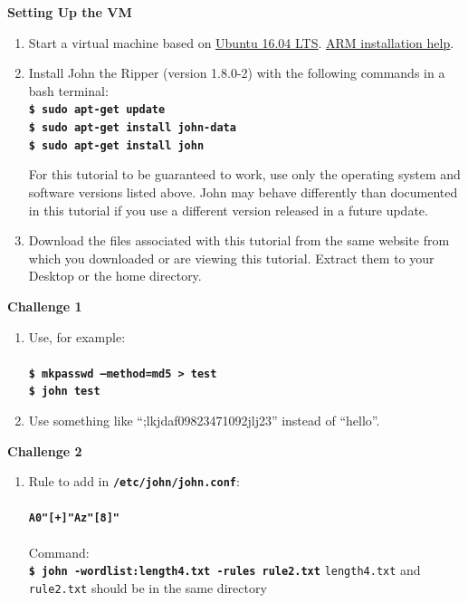 \documentclass[12pt]{extarticle}
\newcommand{\code}[1]{\texttt{\bfseries#1}}
\newcommand{\ben}{\begin{enumerate}}
\newcommand{\een}{\end{enumerate}}
\begin{document}
	\textbf{Setting Up the VM}
	
	\begin{enumerate}
		\item Start a virtual machine based on \hyperref{https://releases.ubuntu.com/16.04/}{}{}{\underline{Ubuntu 16.04 LTS}}. \hyperref{https://wiki.ubuntu.com/ARM/Server/Install}{}{}{\underline{ARM installation help}}.
		\item Install John the Ripper (version 1.8.0-2) with the following commands in a bash terminal:\\
		\code{\$ sudo apt-get update \\
			\$ sudo apt-get install john-data \\
			\$ sudo apt-get install john}
		
		For this tutorial to be guaranteed to work, use only the operating system and software versions listed above. John may behave differently than documented in this tutorial if you use a different version released in a future update.
		\item{Download the files associated with this tutorial from the same website from which you downloaded or are viewing this tutorial. Extract them to your Desktop or the home directory.}
	\end{enumerate}
	
	\textbf{Challenge 1}
	
	\ben
	
	\item Use, for example: \\\\
	\code{\$ mkpasswd --method=md5 > test\\
		\$ john test} \\
	
	\item Use something like ``;lkjdaf09823471092jlj23'' instead of ``hello''.
	
	\een
	
	\textbf{Challenge 2}
	\ben
	
	\item Rule to add in \code{/etc/john/john.conf}: \\\\
	\code{A0"[+]"Az"[8]"}\\\\
	Command:\\ \code{\$ john -wordlist:length4.txt -rules rule2.txt}
	\texttt{length4.txt} and \texttt{rule2.txt} should be in the same directory
	
	\een
	
\end{document}
